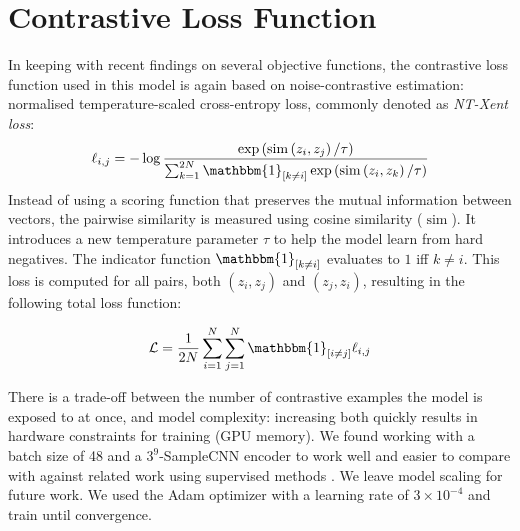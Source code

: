 \documentclass{report}
\begin{document}
\section{Contrastive Loss Function}
In keeping with recent findings on several objective functions\cite{chen_simple_2020}, the contrastive loss function used in this model is again based on noise-contrastive estimation: normalised temperature-scaled cross-entropy loss, commonly denoted as \emph{NT-Xent loss}:
\begin{equation}
    \label{ntxent_loss}
    \ell_{i, j}=-\log \frac{\exp \left(\operatorname{sim}\left(z_{i}, z_{j}\right) / \tau\right)}{\sum_{k=1}^{2 N} \mathbbm{1}_{[k \neq i]} \exp \left(\operatorname{sim}\left(z_{i}, z_{k}\right) / \tau\right)}
\end{equation}
Instead of using a scoring function that preserves the mutual information between vectors, the pairwise similarity is measured using cosine similarity ($\operatorname{sim}$).
It introduces a new temperature parameter $\tau$ to help the model learn from hard negatives. The indicator function $\mathbbm{1}_{[k \neq i]}$ evaluates to $1$ iff $k\neq i$.
This loss is computed for all pairs, both $(z_i, z_j)$ and $(z_j, z_i)$, resulting in the following total loss function:

\begin{equation}
    \label{total_xent_loss}
    \mathcal{L} = \frac{1}{2N}\sum_{i=1}^{N}\sum_{j=1}^{N} \mathbbm{1}_{[i\neq j]}\ell_{i, j}
\end{equation}

There is a trade-off between the number of contrastive examples the model is exposed to at once, and model complexity: increasing both quickly results in hardware constraints for training (GPU memory). We found working with a batch size of 48 and a $3^9$-SampleCNN encoder to work well and easier to compare with against related work using supervised methods \cite{lee2018samplecnn, dieleman2014end,pons_end--end_2017}. We leave model scaling for future work. We used the Adam optimizer \cite{adam_optimizer} with a learning rate of $3\times10^{-4}$ and train until convergence.
\end{document}
